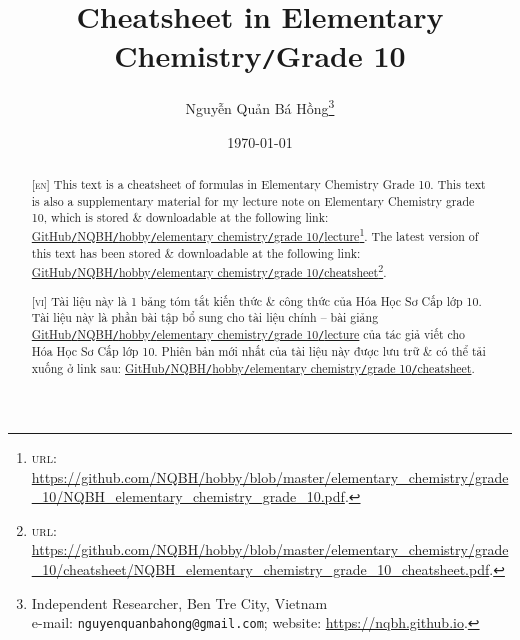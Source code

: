 \documentclass{article}
\title{Cheatsheet in Elementary Chemistry\texttt{/}Grade 10}
\author{Nguyễn Quản Bá Hồng\footnote{Independent Researcher, Ben Tre City, Vietnam\\e-mail: \texttt{nguyenquanbahong@gmail.com}; website: \url{https://nqbh.github.io}.}}
\date{\today}
\numberwithin{equation}{section}
\begin{document}
\maketitle
\begin{abstract}
	\textsc{[en]} This text is a cheatsheet of formulas in Elementary Chemistry Grade 10. This text is also a supplementary material for my lecture note on Elementary Chemistry grade 10, which is stored \& downloadable at the following link: \href{https://github.com/NQBH/hobby/blob/master/elementary_chemistry/grade_10/NQBH_elementary_chemistry_grade_10.pdf}{GitHub\texttt{/}NQBH\texttt{/}hobby\texttt{/}elementary chemistry\texttt{/}grade 10\texttt{/}lecture}\footnote{\textsc{url}: \url{https://github.com/NQBH/hobby/blob/master/elementary_chemistry/grade_10/NQBH_elementary_chemistry_grade_10.pdf}.}. The latest version of this text has been stored \& downloadable at the following link: \href{https://github.com/NQBH/hobby/blob/master/elementary_chemistry/grade_10/cheatsheet/NQBH_elementary_chemistry_grade_10_cheatsheet.pdf}{GitHub\texttt{/}NQBH\texttt{/}hobby\texttt{/}elementary chemistry\texttt{/}grade 10\texttt{/}cheatsheet}\footnote{\textsc{url}: \url{https://github.com/NQBH/hobby/blob/master/elementary_chemistry/grade_10/cheatsheet/NQBH_elementary_chemistry_grade_10_cheatsheet.pdf}.}.
	\vspace{2mm}
	
	\textsc{[vi]} Tài liệu này là 1 bảng tóm tắt kiến thức \& công thức của Hóa Học Sơ Cấp lớp 10. Tài liệu này là phần bài tập bổ sung cho tài liệu chính -- bài giảng \href{https://github.com/NQBH/hobby/blob/master/elementary_chemistry/grade_10/NQBH_elementary_chemistry_grade_10.pdf}{GitHub\texttt{/}NQBH\texttt{/}hobby\texttt{/}elementary chemistry\texttt{/}grade 10\texttt{/}lecture} của tác giả viết cho Hóa Học Sơ Cấp lớp 10. Phiên bản mới nhất của tài liệu này được lưu trữ \& có thể tải xuống ở link sau: \href{https://github.com/NQBH/hobby/blob/master/elementary_chemistry/grade_10/cheatsheet/NQBH_elementary_chemistry_grade_10_cheatsheet.pdf}{GitHub\texttt{/}NQBH\texttt{/}hobby\texttt{/}elementary chemistry\texttt{/}grade 10\texttt{/}cheatsheet}.
\end{abstract}
\tableofcontents
\newpage

\end{document}
